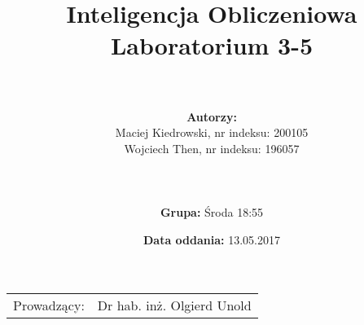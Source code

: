 \documentclass{article}
\title{Inteligencja Obliczeniowa\\
	\vspace{5mm}
	\textbf{Laboratorium 3-5}
}
\author{\\
	\\\textbf{Autorzy:}
	\\Maciej Kiedrowski, nr indeksu: 200105
	\\Wojciech Then, nr indeksu: 196057
	\\
	\\
	\\
	\\\textbf{Grupa:} Środa 18:55}
\date{\textbf{Data oddania:} 13.05.2017}
\begin{document}
	\maketitle %

	\begin{center}
		\begin{tabular}{l r}
			Prowadzący: & Dr hab. inż. Olgierd Unold

		\end{tabular}
	\end{center}


	\newpage
	\tableofcontents 	%
	\newpage

	
	\newpage
	
	\newpage
	
	\newpage
	
\end{document}
